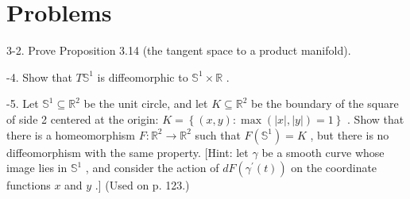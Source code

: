 \section{Problems}

\begin{exercise}
\label{prob:3-2}
\leanok
{}
3-2. Prove Proposition 3.14 (the tangent space to a product manifold).
\end{exercise}

\begin{exercise}
\label{prob:3-4}
-4. Show that $T{\mathbb{S}}^{1}$ is diffeomorphic to ${\mathbb{S}}^{1} \times  \mathbb{R}$ .
\end{exercise}

\begin{exercise}
\label{prob:3-5}
-5. Let ${\mathbb{S}}^{1} \subseteq  {\mathbb{R}}^{2}$ be the unit circle, and let $K \subseteq  {\mathbb{R}}^{2}$ be the boundary of the square of side 2 centered at the origin: $K = \left\{  {\left( {x, y}\right)  : \max \left( {\left| x\right| ,\left| y\right| }\right)  = 1}\right\}$ . Show that there is a homeomorphism $F : {\mathbb{R}}^{2} \rightarrow  {\mathbb{R}}^{2}$ such that $F\left( {\mathbb{S}}^{1}\right)  = K$ , but there is no diffeomorphism with the same property. [Hint: let $\gamma$ be a smooth curve whose image lies in ${\mathbb{S}}^{1}$ , and consider the action of ${dF}\left( {{\gamma }^{\prime }\left( t\right) }\right)$ on the coordinate functions $x$ and $y$ .] (Used on p. 123.)
\end{exercise}

